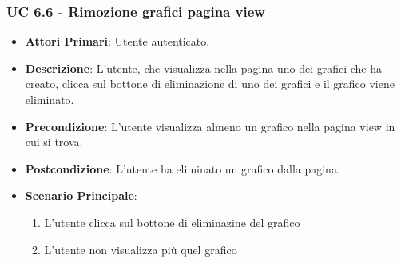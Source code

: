			\subsubsection{UC 6.6 - Rimozione grafici pagina view}
			\begin{itemize}
				\item \textbf{Attori Primari}: Utente autenticato.
				\item \textbf{Descrizione}: L'utente, che visualizza nella pagina uno dei grafici che ha creato, clicca sul bottone di eliminazione di uno dei grafici e il grafico viene eliminato.
				\item \textbf{Precondizione}: L'utente visualizza almeno un grafico nella pagina view in cui si trova.
				\item \textbf{Postcondizione}: L'utente ha eliminato un grafico dalla pagina.
				\item \textbf{Scenario Principale}:
				\begin{enumerate}
					\item{L'utente clicca sul bottone di eliminazine del grafico}
					\item{L'utente non visualizza più quel grafico}
				\end{enumerate}	
			\end{itemize}